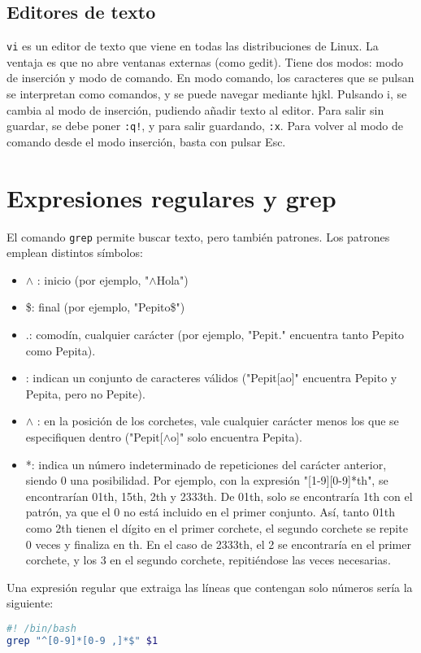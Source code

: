 \subsection{Editores de texto}
\texttt{vi} es un editor de texto que viene en todas las distribuciones de Linux. La ventaja es que no abre ventanas externas (como gedit). Tiene dos modos: modo de inserción y modo de comando. En modo comando, los caracteres que se pulsan se interpretan como comandos, y se puede navegar mediante hjkl. Pulsando i, se cambia al modo de inserción, pudiendo añadir texto al editor. Para salir sin guardar, se debe poner \texttt{:q!}, y para salir guardando, \texttt{:x}. Para volver al modo de comando desde el modo inserción, basta con pulsar Esc. 

\section{Expresiones regulares y grep}
El comando \texttt{grep} permite buscar texto, pero también patrones. Los patrones emplean distintos símbolos:
\begin{itemize}
\item $\wedge$ : inicio (por ejemplo, "$\wedge$Hola")
\item \$: final (por ejemplo, "Pepito\$")
\item .: comodín, cualquier carácter (por ejemplo, "Pepit." encuentra tanto Pepito como Pepita).
\item \lbrack \rbrack: indican un conjunto de caracteres válidos ("Pepit[ao]" encuentra Pepito y Pepita, pero no Pepite).
\item \lbrack  $\wedge$ \rbrack : en la posición de los corchetes, vale cualquier carácter menos los que se especifiquen dentro ("Pepit[$\wedge$o]" solo encuentra Pepita).
\item *: indica un número indeterminado de repeticiones del carácter anterior, siendo 0 una posibilidad. Por ejemplo, con la expresión "[1-9][0-9]*th", se encontrarían 01th, 15th, 2th y 2333th. De 01th, solo se encontraría 1th con el patrón, ya que el 0 no está incluido en el primer conjunto. Así, tanto 01th como 2th tienen el dígito en el primer corchete, el segundo corchete se repite 0 veces y finaliza en th. En el caso de 2333th, el 2 se encontraría en el primer corchete, y los 3 en el segundo corchete, repitiéndose las veces necesarias. 
\end{itemize} 

Una expresión regular que extraiga las líneas que contengan solo números sería la siguiente:
\begin{lstlisting}[language=bash]
#! /bin/bash
grep "^[0-9]*[0-9 ,]*$" $1
\end{lstlisting}
